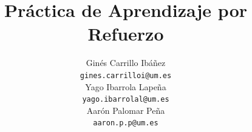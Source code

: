 \documentclass[a4paper, 10pt, twocolumn]{report}
\title{Práctica de Aprendizaje por Refuerzo}%
\author{ 
Ginés Carrillo Ibáñez 	\\
\texttt{gines.carrilloi@um.es} \\[0.25cm]
Yago Ibarrola Lapeña 	\\
\texttt{yago.ibarrolal@um.es} \\[0.25cm]
Aarón Palomar Peña 	\\
\texttt{aaron.p.p@um.es}}
\begin{document}
\maketitle %



\tableofcontents 

 

\nocite{*}

 
\end{document}
